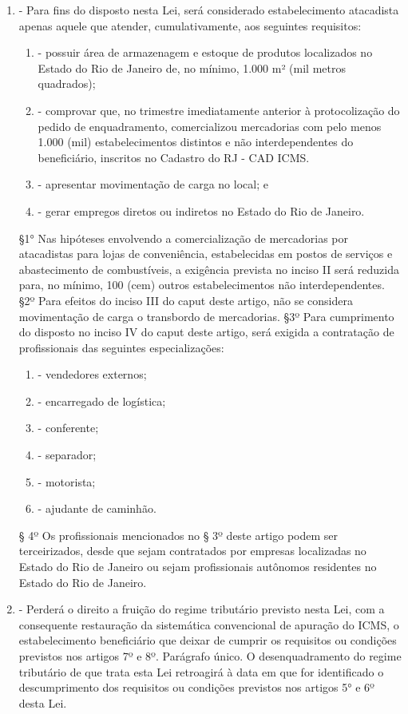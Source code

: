 \documentclass[10pt]{article}
\begin{document}
\begin{enumerate}[label=Art. \arabic*\textdegree]
\item - Para fins do disposto nesta Lei, será considerado estabelecimento atacadista apenas aquele que atender, cumulativamente, aos seguintes requisitos:
\begin{enumerate}[label=\Roman*]
\item - possuir área de armazenagem e estoque de produtos localizados no Estado do Rio de Janeiro de, no mínimo, 1.000 m² (mil metros quadrados);
\item - comprovar que, no trimestre imediatamente anterior à protocolização do pedido de enquadramento, comercializou mercadorias com pelo menos 1.000 (mil) estabelecimentos distintos e não interdependentes do beneficiário, inscritos no Cadastro do RJ - CAD ICMS. 
\item - apresentar movimentação de carga no local; e
\item - gerar empregos diretos ou indiretos no Estado do Rio de Janeiro.
\end{enumerate}
§1° Nas hipóteses envolvendo a comercialização de mercadorias por atacadistas para lojas de conveniência, estabelecidas em postos de serviços e abastecimento de combustíveis, a exigência prevista no inciso II será reduzida para, no mínimo, 100 (cem) outros estabelecimentos não interdependentes.
§2º Para efeitos do inciso III do caput deste artigo, não se considera movimentação de carga o transbordo de mercadorias.
§3º Para cumprimento do disposto no inciso IV do caput deste artigo, será exigida a contratação de profissionais das seguintes especializações:
\begin{enumerate}[label=\Roman*]
\item - vendedores externos;
\item - encarregado de logística;
\item - conferente;
\item - separador;
\item - motorista;
\item - ajudante de caminhão.
\end{enumerate}
§ 4º Os profissionais mencionados no § 3º deste artigo podem ser terceirizados, desde que sejam contratados por empresas localizadas no Estado do Rio de Janeiro ou sejam profissionais autônomos residentes no Estado do Rio de Janeiro.

\item - Perderá o direito a fruição do regime tributário previsto nesta Lei, com a consequente restauração da sistemática convencional de apuração do ICMS, o estabelecimento beneficiário que deixar de cumprir os requisitos ou condições previstos nos artigos 7º e 8º.
Parágrafo único. O desenquadramento do regime tributário de que trata esta Lei retroagirá à data em que for identificado o descumprimento dos requisitos ou condições previstos nos artigos 5° e 6º desta Lei.


\end{enumerate}
\end{document}
